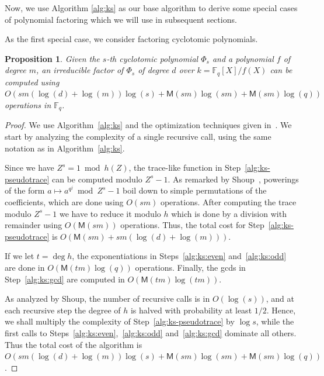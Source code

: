 \documentclass[12pt]{article}
\theoremstyle{plain}
\newtheorem{proposition}[theorem]{Proposition}
\theoremstyle{definition}
\def\F{\ensuremath{\mathbb{F}}}
\def\MM{\ensuremath{\mathsf{M}}}
\newcounter{algorithm}
\begin{document}
Now, we use Algorithm \ref{alg:ks} as our base algorithm to derive some
special cases of polynomial factoring which we will use in subsequent sections.

As the first special case, we consider factoring cyclotomic polynomials.
\begin{proposition}
  \label{prop:cyclo}
  Given the $s$-th cyclotomic polynomial $\Phi_s$ and a polynomial $f$ of degree $m$,
  an irreducible factor of $\Phi_s$ of degree $d$ over $k=\F_q[X]/f(X)$ 
  can be computed using $O(sm(\log(d)+\log(m))\log(s) + \MM(sm)\log(sm) + 
  \MM(sm)\log(q))$ operations in $\F_q$.
\end{proposition}
\begin{proof}
  We use Algorithm~\ref{alg:ks} and the optimization techniques given
  in~\cite{shoup94}. We start by analyzing the complexity of a single
  recursive call, using the same notation as in
  Algorithm~\ref{alg:ks}.

  Since we have $Z^s = 1\bmod h(Z)$, the trace-like function in
  Step~\ref{alg:ks-pseudotrace} can be computed modulo $Z^s - 1$. As
  remarked by Shoup~\cite{shoup94}, powerings of the form
  $a\mapsto a^{q^j} \bmod Z^s-1$ boil down to simple permutations of
  the coefficients, which are done using $O(sm)$ operations. After
  computing the trace modulo $Z^s - 1$ we have to reduce it modulo $h$
  which is done by a division with remainder using $O(\MM(sm))$
  operations.  Thus, the total cost for Step~\ref{alg:ks-pseudotrace}
  is $O(\MM(sm) + sm(\log(d)+\log(m)))$.

  If we let $t=\deg h$, the exponentiations in Steps~\ref{alg:ks:even}
  and~\ref{alg:ks:odd} are done in $O(\MM(tm)\log(q))$
  operations. Finally, the gcds in Step~\ref{alg:ks:gcd} are computed
  in $O(\MM(tm)\log(tm))$.

  As analyzed by Shoup, the number of recursive calls is in
  $O(\log(s))$, and at each recursive step the degree of $h$ is halved
  with probability at least $1/2$. Hence, we shall multiply the
  complexity of Step~\ref{alg:ks-pseudotrace} by
  $\log s$, while the first calls to Steps~\ref{alg:ks:even},~\ref{alg:ks:odd}
  and~\ref{alg:ks:gcd} dominate all others. Thus the total cost of the algorithm is
  $O(sm(\log(d)+\log(m))\log(s) + \MM(sm)\log(sm) + \MM(sm)\log(q))$.
\end{proof}
\end{document}
